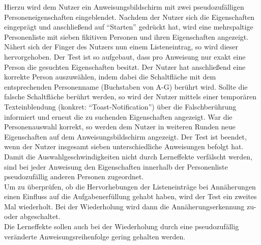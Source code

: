 \documentclass[a4paper,12pt,bibliography=totoc]{scrreprt}%
\begin{document}
Hierzu wird dem Nutzer ein Anweisungsbildschirm mit zwei pseudozufälligen Personeneigenschaften eingeblendet. Nachdem der Nutzer sich die Eigenschaften eingeprägt und anschließend auf "`Starten"' gedrückt hat, wird eine mehrspaltige Personenliste mit sieben fikitiven Personen und ihren Eigenschaften angezeigt. Nähert sich der Finger des Nutzers nun einem Listeneintrag, so wird dieser hervorgehoben. Der Test ist so aufgebaut, dass pro Anweisung nur exakt eine Person die gesuchten Eigenschaften besitzt. Der Nutzer hat anschließend eine korrekte Person auszuwählen, indem dabei die Schaltfläche mit dem entsprechenden Personenname (Buchstaben von A-G) berührt wird. Sollte die falsche Schaltfläche berührt werden, so wird der Nutzer mittels einer temporären Texteinblendung (konkret: "`Toast-Notification"') über die Falschberührung informiert und erneut die zu suchenden Eigenschaften angezeigt. War die Personenauswahl korrekt, so werden dem Nutzer in weiteren Runden neue Eigenschaften auf dem Anweisungsbildschirm angezeigt. Der Test ist beendet, wenn der Nutzer insgesamt sieben unterschiedliche Anweisungen befolgt hat.\\
Damit die Auswahlgeschwindigkeiten nicht durch Lerneffekte verfälscht werden, sind bei jeder Anweisung den Eigenschaften innerhalb der Personenliste pseudozufällig anderen Personen zugeordnet.\\
Um zu überprüfen, ob die Hervorhebungen der Listeneinträge bei Annäherungen einen Einfluss auf die Aufgabenerfüllung gehabt haben, wird der Test ein zweites Mal wiederholt. Bei der Wiederholung wird dann die Annäherungserkennung zu- oder abgeschaltet.\\
Die Lerneffekte sollen auch bei der Wiederholung durch eine pseudozufällig veränderte Anweisungsreihenfolge gering gehalten werden.
\end{document}
